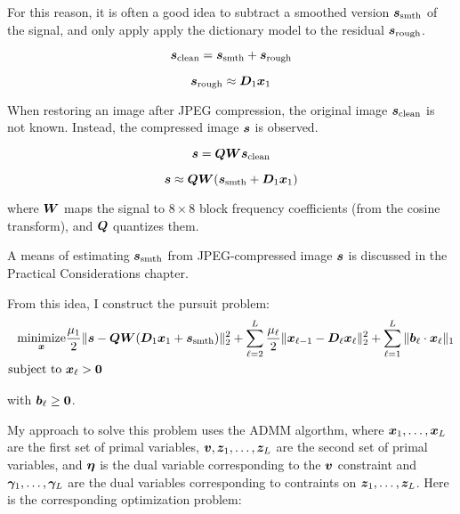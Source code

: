 For this reason, it is often a good idea to subtract a smoothed version $\bm{s}_{\text{smth}}$ of the signal, and only apply apply the dictionary model to the residual $\bm{s}_{\text{rough}}$.

\begin{equation}
\bm{s}_{\text{clean}} = \bm{s}_{\text{smth}} + \bm{s}_{\text{rough}}
\end{equation}

\begin{equation}
\bm{s}_{\text{rough}} \approx \bm{D}_1\bm{x}_1
\end{equation}

When restoring an image after JPEG compression, the original image $\bm{s}_{\text{clean}}$ is not known. Instead, the compressed image $\bm{s}$ is observed.

\begin{equation}
\bm{s} = \bm{Q}\bm{W}\bm{s}_{\text{clean}}
\end{equation}

\begin{equation}
\bm{s} \approx \bm{Q}\bm{W}(\bm{s}_{\text{smth}} + \bm{D}_1\bm{x}_1)
\end{equation}

where $\bm{W}$ maps the signal to $8 \times 8$ block frequency coefficients (from the cosine transform), and $\bm{Q}$ quantizes them.

A means of estimating $\bm{s}_{\text{smth}}$ from JPEG-compressed image $\bm{s}$ is discussed in the Practical Considerations chapter.

From this idea, I construct the pursuit problem:
\begin{equation}
\begin{aligned}
\operatorname*{\text{minimize}}_{\bm{x}} & \frac{\mu_1}{2}\|\bm{s} - \bm{Q}\bm{W}(\bm{D}_1\bm{x}_1 + \bm{s}_{\text{smth}})\|_2^2 + \sum_{\ell = 2}^L \frac{\mu_{\ell}}{2}\|\bm{x}_{\ell - 1} - \bm{D}_{\ell}\bm{x}_{\ell}\|_2^2 + \sum_{\ell = 1}^L \|\bm{b}_{\ell} \cdot \bm{x}_{\ell}\|_1 \\
\text{subject to } & \bm{x}_{\ell} > \bm{0}
\end{aligned}
\end{equation}

with $\bm{b}_{\ell} \geq \bm{0}$.

My approach to solve this problem uses the ADMM algorthm, where $\bm{x}_1,\ldots,\bm{x}_L$ are the first set of primal variables, $\bm{v},\bm{z}_1,\ldots,\bm{z}_L$ are the second set of primal variables, and $\bm{\eta}$ is the dual variable corresponding to the $\bm{v}$ constraint and $\bm{\gamma}_1,\ldots,\bm{\gamma}_L$ are the dual variables corresponding to contraints on $\bm{z}_1,\ldots,\bm{z}_L$.  Here is the corresponding optimization problem:

